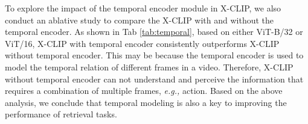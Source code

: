 \documentclass[sigconf]{acmart}
\begin{document}
\begin{table}[]
\caption{Ablation study of temporal encoder on the MSR-VTT dataset. \emph{TE} is short for temporal encoder.}
\vspace{-0.3cm}
\vspace{-0.2cm}
\label{tab:temporal}
\end{table}

To explore the impact of the temporal encoder module in X-CLIP, we also conduct an ablative study to compare the X-CLIP with and without the temporal encoder. As shown in Tab \ref{tab:temporal}, based on either ViT-B/32 or ViT/16, X-CLIP with temporal encoder consistently outperforms X-CLIP without temporal encoder. This may be because the temporal encoder is used to model the temporal relation of different frames in a video. Therefore, X-CLIP without temporal encoder can not understand and perceive the information that requires a combination of multiple frames, \emph{e.g.,} action. Based on the above analysis, we conclude that temporal modeling is also a key to improving the performance of retrieval tasks.
\end{document}
